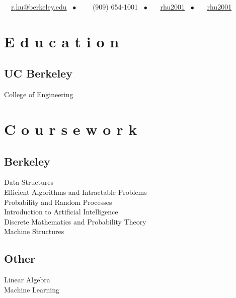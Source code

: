 \documentclass[]{deedy-resume-openfont}
\begin{document}
%
%
{\faEnvelope \ \ \href{mailto:r.hu@berkeley.edu}{r.hu@berkeley.edu} \ \(\bullet\) \ \ \faPhone \ \ (909)  654-1001 \ \(\bullet\) \ \faGithub \ \ \href{https://github.com/rhu2001}{rhu2001} \ \(\bullet\) \ \faLinkedin \ \ \href{https://www.linkedin.com/in/rhu2001/}{rhu2001}}

%
%

\begin{minipage}[t]{0.33\textwidth} 


\section{E d u c a t i o n} 

\subsection{UC Berkeley}
College of Engineering \\
\sectionsep


\section{C o u r s e w o r k}

\subsection{Berkeley}
Data Structures \\
Efficient Algorithms and Intractable Problems \\
Probability and Random Processes \\
Introduction to Artificial Intelligence \\
Discrete Mathematics and Probability Theory \\
Machine Structures \\
\subsection{Other}
Linear Algebra \\
Machine Learning \\
\sectionsep


\end{minipage}
\end{document}
